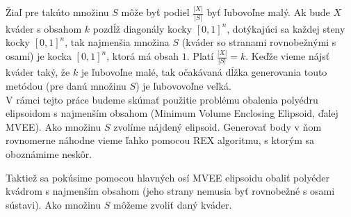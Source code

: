 Žiaľ pre takúto množinu $S$ môže byť podiel $\frac{|X|}{|S|}$ byť ľubovoľne malý. Ak bude $X$ kváder s obsahom $k$ pozdĺž diagonály kocky $[0,1]^n$, dotýkajúci sa každej steny kocky $[0,1]^n$, tak najmenšia množina $S$ (kváder so stranami rovnobežnými s osami) je kocka $[0,1]^n$, ktorá má obsah $1$. Platí $\frac{|X|}{|S|}=k$. Keďže vieme nájsť kváder taký, že $k$ je ľubovoľne malé, tak očakávaná dĺžka generovania touto metódou (pre danú množinu $S$) je ľubovovoľne veľká.\\

V rámci tejto práce budeme skúmať použitie problému obalenia polyédru elipsoidom s najmenším obsahom (Minimum Volume Enclosing Elipsoid, ďalej MVEE). Ako množinu $S$ zvolíme nájdený elipsoid. Generovať body v ňom rovnomerne náhodne vieme ľahko pomocou REX algoritmu, s ktorým sa oboznámime neskôr.

Taktiež sa pokúsime pomocou hlavných osí MVEE elipsoidu obaliť polyéder kvádrom s najmenším obsahom (jeho strany nemusia byť rovnobežné s osami sústavi). Ako množinu $S$ môžeme zvoliť daný kváder.

